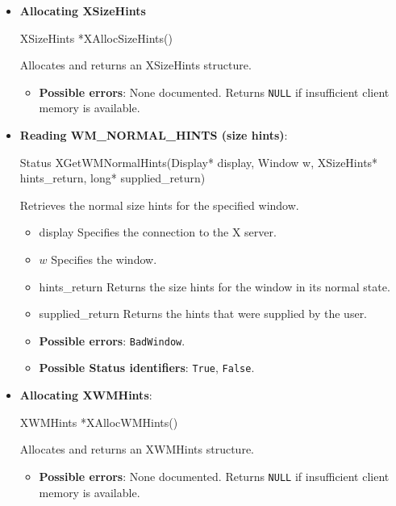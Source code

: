 \documentclass{report}
\begin{document}
\begin{itemize}
        \item \textbf{Allocating XSizeHints}
            \bigbreak \noindent 
            \begin{cppcode}
                XSizeHints *XAllocSizeHints()
            \end{cppcode}
            \bigbreak \noindent
            Allocates and returns an XSizeHints structure.
            \begin{itemize}
                \item \textbf{Possible errors}: None documented. Returns \texttt{NULL} if insufficient client memory is available.
            \end{itemize}
        \item \textbf{Reading WM\_NORMAL\_HINTS (size hints)}:
            \bigbreak \noindent 
            \begin{cppcode}
            Status XGetWMNormalHints(Display* display, Window w, XSizeHints* hints_return, long* supplied_return)
            \end{cppcode}
            \bigbreak \noindent
            Retrieves the normal size hints for the specified window.
            \begin{itemize}
                \item display Specifies the connection to the X server.
                \item $w$ Specifies the window.
                \item hints\_return Returns the size hints for the window in its normal state.
                \item supplied\_return Returns the hints that were supplied by the user.
            \end{itemize}
            \begin{itemize}
                \item \textbf{Possible errors}: \texttt{BadWindow}.
                \item \textbf{Possible Status identifiers}: \texttt{True}, \texttt{False}.
            \end{itemize}

        \item \textbf{Allocating XWMHints}:
            \bigbreak \noindent 
            \begin{cppcode}
                XWMHints *XAllocWMHints()
            \end{cppcode}
            \bigbreak \noindent
            Allocates and returns an XWMHints structure.
            \begin{itemize}
                \item \textbf{Possible errors}: None documented. Returns \texttt{NULL} if insufficient client memory is available.
            \end{itemize}


\end{itemize}
\end{document}
